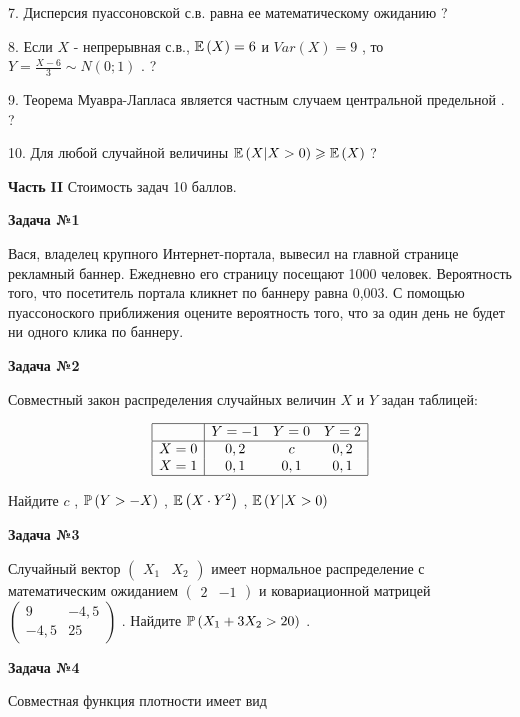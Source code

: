 \documentclass[pdftex,12pt,a4paper]{article}
\begin{document}
7. Дисперсия пуассоновской с.в. равна ее математическому ожиданию ?

8. Если  $X$  - непрерывная с.в.,  $\E\left(X\right)=6$  и  $Var\left(X\right)=9$ , то  $Y=\frac{X-6}{3} \sim N\left(0;1\right)$ . ?

9. Теорема Муавра-Лапласа является частным случаем центральной предельной . ?

10. Для любой случайной величины  $\E\left(X|X>0\right)\ge \E\left(X\right)$  ?

{\bf Часть }{\bf II} Стоимость задач 10 баллов.

{\bf Задача №1}

Вася, владелец крупного Интернет-портала, вывесил на главной странице рекламный баннер. Ежедневно его страницу посещают 1000 человек. Вероятность того, что посетитель портала кликнет по баннеру равна 0,003. С помощью пуассоноского приближения оцените вероятность того, что за один день не будет ни одного клика по баннеру.

{\bf Задача №2}

Совместный закон распределения случайных величин  $X$  и  $Y$  задан таблицей:

$$\begin{array}{|c|ccc|}  \hline {} & {Y=-1} & {Y=0} & {Y=2} \\  \hline {X=0} & {0,2} & {c} & {0,2} \\ {X=1} & {0,1} & {0,1} & {0,1} \\  \hline  \end{array}$$

Найдите  $c$ ,  $\P\left(Y>-X\right)$ ,  $\E\left(X\cdot Y^{2} \right)$ ,  $\E\left(Y|X>0\right)$ 

{\bf Задача №3}

Случайный вектор  $\left(\begin{array}{cc} {X_{1} } & {X_{2} } \end{array}\right)$  имеет нормальное распределение с математическим ожиданием  $\left(\begin{array}{cc} {2} & {-1} \end{array}\right)$  и ковариационной матрицей  $\left(\begin{array}{cc} {9} & {-4,5} \\ {-4,5} & {25} \end{array}\right)$ . Найдите  $\P\left(X_{1} +3X_{2} >20\right)$ .

{\bf Задача №4}

Совместная функция плотности имеет вид
\end{document}
